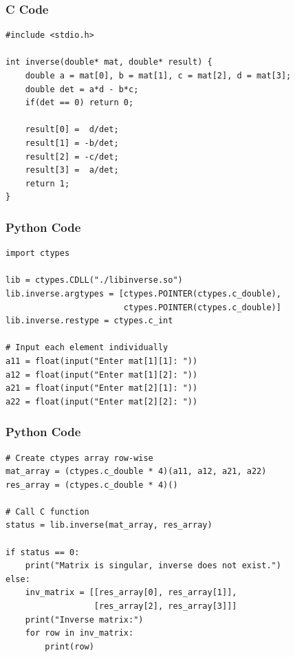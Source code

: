 \documentclass{beamer}
\begin{document}
 \begin{frame}[fragile]
\frametitle{C Code }
\begin{lstlisting}
#include <stdio.h>

int inverse(double* mat, double* result) {
    double a = mat[0], b = mat[1], c = mat[2], d = mat[3];
    double det = a*d - b*c;
    if(det == 0) return 0;
    
    result[0] =  d/det;
    result[1] = -b/det;
    result[2] = -c/det;
    result[3] =  a/det;
    return 1;
}

\end{lstlisting}
\end{frame}

 \begin{frame}[fragile]
\frametitle{Python Code }
\begin{lstlisting}
import ctypes

lib = ctypes.CDLL("./libinverse.so")
lib.inverse.argtypes = [ctypes.POINTER(ctypes.c_double),
                        ctypes.POINTER(ctypes.c_double)]
lib.inverse.restype = ctypes.c_int

# Input each element individually
a11 = float(input("Enter mat[1][1]: "))
a12 = float(input("Enter mat[1][2]: "))
a21 = float(input("Enter mat[2][1]: "))
a22 = float(input("Enter mat[2][2]: "))
\end{lstlisting}
\end{frame}

 \begin{frame}[fragile]
\frametitle{Python Code }
\begin{lstlisting}
# Create ctypes array row-wise
mat_array = (ctypes.c_double * 4)(a11, a12, a21, a22)
res_array = (ctypes.c_double * 4)()

# Call C function
status = lib.inverse(mat_array, res_array)

if status == 0:
    print("Matrix is singular, inverse does not exist.")
else:
    inv_matrix = [[res_array[0], res_array[1]],
                  [res_array[2], res_array[3]]]
    print("Inverse matrix:")
    for row in inv_matrix:
        print(row)
\end{lstlisting}
\end{frame}
\end{document}
